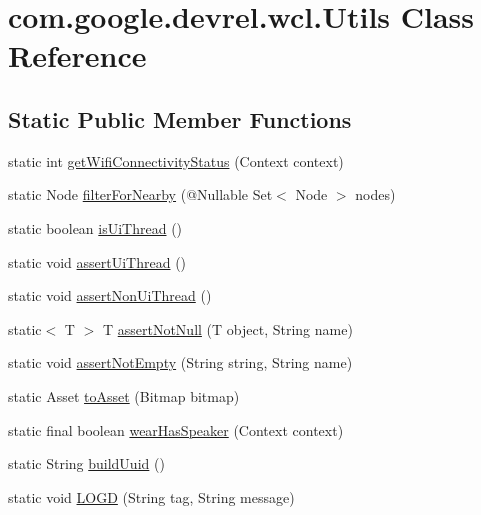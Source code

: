 \hypertarget{classcom_1_1google_1_1devrel_1_1wcl_1_1Utils}{}\section{com.\+google.\+devrel.\+wcl.\+Utils Class Reference}
\label{classcom_1_1google_1_1devrel_1_1wcl_1_1Utils}
\subsection*{Static Public Member Functions}
\begin{DoxyCompactItemize}
\item 
static int \hyperlink{classcom_1_1google_1_1devrel_1_1wcl_1_1Utils_afdcb01a7c4c15fb8eee5e939bf909c2f}{get\+Wifi\+Connectivity\+Status} (Context context)
\item 
static Node \hyperlink{classcom_1_1google_1_1devrel_1_1wcl_1_1Utils_a6cad21ff79fa0fe2a34947b48e3f53fb}{filter\+For\+Nearby} (@Nullable Set$<$ Node $>$ nodes)
\item 
static boolean \hyperlink{classcom_1_1google_1_1devrel_1_1wcl_1_1Utils_ae788d176cca50e3e035e19c229a1d855}{is\+Ui\+Thread} ()
\item 
static void \hyperlink{classcom_1_1google_1_1devrel_1_1wcl_1_1Utils_a94b6bc1c6ae64456c006627e41e2b3e7}{assert\+Ui\+Thread} ()
\item 
static void \hyperlink{classcom_1_1google_1_1devrel_1_1wcl_1_1Utils_aead382b1097686c859b9127db8f7c68a}{assert\+Non\+Ui\+Thread} ()
\item 
static$<$ T $>$ T \hyperlink{classcom_1_1google_1_1devrel_1_1wcl_1_1Utils_a74e2b69191420bcbe0293e53d6a93391}{assert\+Not\+Null} (T object, String name)
\item 
static void \hyperlink{classcom_1_1google_1_1devrel_1_1wcl_1_1Utils_a39675caf16886fb57cb99afca5d91424}{assert\+Not\+Empty} (String string, String name)
\item 
static Asset \hyperlink{classcom_1_1google_1_1devrel_1_1wcl_1_1Utils_a2d28fdc1d82d96aa85bf2f23f8ca468a}{to\+Asset} (Bitmap bitmap)
\item 
static final boolean \hyperlink{classcom_1_1google_1_1devrel_1_1wcl_1_1Utils_a88052da4733eaae76d051022117a8464}{wear\+Has\+Speaker} (Context context)
\item 
static String \hyperlink{classcom_1_1google_1_1devrel_1_1wcl_1_1Utils_a6675d4b2ad568363fa4e7766f02e203a}{build\+Uuid} ()
\item 
static void \hyperlink{classcom_1_1google_1_1devrel_1_1wcl_1_1Utils_a04e29e5172f90c4f2c2001de10060126}{L\+O\+GD} (String tag, String message)
\end{DoxyCompactItemize}
